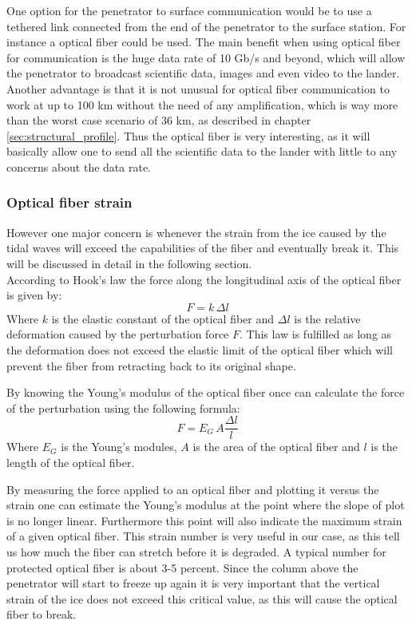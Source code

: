 
One option for the penetrator to surface communication would be to use a tethered link connected from the end of the penetrator to the surface station. For instance a optical fiber could be used. The main benefit when using optical fiber for communication is the huge data rate of 10 Gb/s and beyond, which will allow the penetrator to broadcast scientific data, images and even video to the lander. Another advantage is that it is not unusual for optical fiber communication to work at up to 100 km without the need of any amplification\cite{website:optical_fiber_info}, which is way more than the worst case scenario of 36 km, as described in chapter \ref{sec:structural_profile}. Thus the optical fiber is very interesting, as it will basically allow one to send all the scientific data to the lander with little to any concerns about the data rate.

\subsubsection{Optical fiber strain}

However one major concern is whenever the strain from the ice caused by the tidal waves will exceed the capabilities of the fiber and eventually break it. This will be discussed in detail in the following section.\\

\noindent
According to Hook's law the force along the longitudinal axis of the optical fiber is given by:
\begin{equation}
	 F = k \, \Delta l
\end{equation}
Where $k$ is the elastic constant of the optical fiber and $\Delta l$ is the relative deformation caused by the perturbation force $F$. This law is fulfilled as long as the deformation does not exceed the elastic limit of the optical fiber which will prevent the fiber from retracting back to its original shape.

By knowing the Young's modulus of the optical fiber once can calculate the force of the perturbation using the following formula:
\begin{equation}
	F = E_G \, A \frac{\Delta l}{l}
\end{equation}
Where $E_G$ is the Young's modules, $A$ is the area of the optical fiber and $l$ is the length of the optical fiber.

By measuring the force applied to an optical fiber and plotting it versus the strain one can estimate the Young's modulus at the point where the slope of plot is no longer linear. Furthermore this point will also indicate the maximum strain of a given optical fiber. This strain number is very useful in our case, as this tell us how much the fiber can stretch before it is degraded. A typical number for protected optical fiber is about 3-5 percent\cite{article:optical_fiber_properties,article:optical_fiber_mechanical}. Since the column above the penetrator will start to freeze up again it is very important that the vertical strain of the ice does not exceed this critical value, as this will cause the optical fiber to break.

